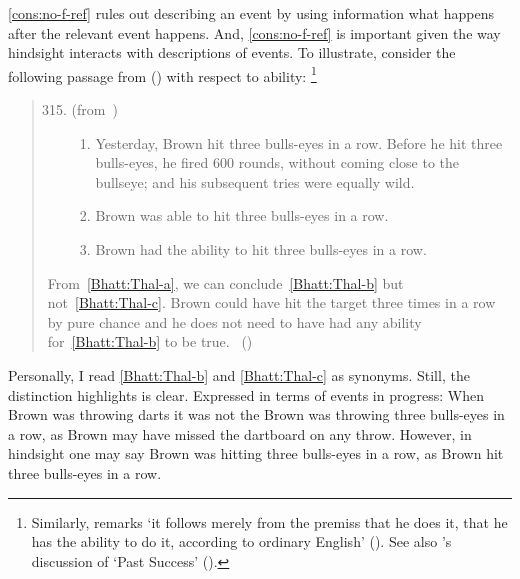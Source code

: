 \begin{note}
  \noindent%
  \autoref{cons:no-f-ref} rules out describing an event by using information what happens after the relevant event happens.
  And, \autoref{cons:no-f-ref} is important given the way hindsight interacts with descriptions of events.
  To illustrate, consider the following passage from \citeauthor{Bhatt:2008aa} (\citeyear{Bhatt:2008aa}) with respect to ability:%
  \footnote{
    Similarly, \citeauthor{Austin:1961vz} remarks `it follows merely from the premiss that he does it, that he has the ability to do it, according to ordinary English' (\citeyear[175]{Austin:1961vz}).
    See also \citeauthor{Boylan:2020aa}'s discussion of `Past Success' (\citeyear[\S1.1]{Boylan:2020aa}).
  }
  \begin{quote}
    \begin{enumerate}[label=(\arabic*)]
      \setcounter{enumi}{314}
    \item
      (from~\cite{Thalberg:1969ta})
      \begin{enumerate}[label=\alph*., ref=(315\alph*)]
      \item
        \label{Bhatt:Thal-a}
        Yesterday, Brown hit three bulls-eyes in a row.
        Before he hit three bulls-eyes, he fired 600 rounds, without coming close to the bullseye; and his subsequent tries were equally wild.
      \item
        \label{Bhatt:Thal-b}
        Brown was able to hit three bulls-eyes in a row.
      \item
        \label{Bhatt:Thal-c}
        Brown had the ability to hit three bulls-eyes in a row.
      \end{enumerate}
    \end{enumerate}
    From~\ref{Bhatt:Thal-a}, we can conclude~\ref{Bhatt:Thal-b} but not~\ref{Bhatt:Thal-c}.
    Brown could have hit the target three times in a row by pure chance and he does not need to have had any ability for~\ref{Bhatt:Thal-b} to be true.%
    \mbox{ }\hfill\mbox{(\citeyear[167]{Bhatt:2008aa})}
  \end{quote}
  Personally, I read \ref{Bhatt:Thal-b} and \ref{Bhatt:Thal-c} as synonyms.
  Still, the distinction \citeauthor{Bhatt:2008aa} highlights is clear.
  Expressed in terms of events in progress:
  When Brown was throwing darts it was not the Brown was throwing three bulls-eyes in a row, as Brown may have missed the dartboard on any throw.
  However, in hindsight one may say Brown was hitting three bulls-eyes in a row, as Brown hit three bulls-eyes in a row.


\end{note}
